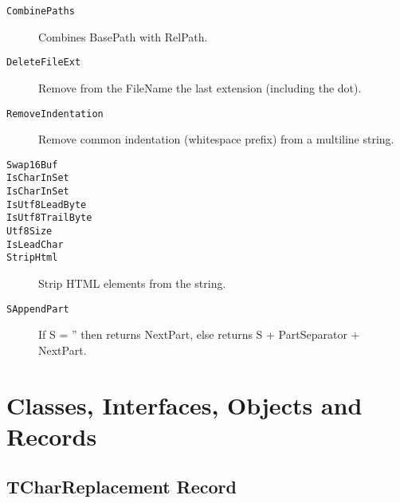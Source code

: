 \documentclass{report}
\newif\ifpdf
\begin{document}
\begin{description}
\item[\texttt{CombinePaths}]Combines BasePath with RelPath.
\item[\texttt{DeleteFileExt}]Remove from the FileName the last extension (including the dot).
\item[\texttt{RemoveIndentation}]Remove common indentation (whitespace prefix) from a multiline string.
\item[\texttt{Swap16Buf}]
\item[\texttt{IsCharInSet}]
\item[\texttt{IsCharInSet}]
\item[\texttt{IsUtf8LeadByte}]
\item[\texttt{IsUtf8TrailByte}]
\item[\texttt{Utf8Size}]
\item[\texttt{IsLeadChar}]
\item[\texttt{StripHtml}]Strip HTML elements from the string.
\item[\texttt{SAppendPart}]If S = '' then returns NextPart, else returns S + PartSeparator + NextPart.
\end{description}
\section{Classes, Interfaces, Objects and Records}
\ifpdf
\subsection*{\large{\textbf{TCharReplacement Record}}\normalsize\hspace{1ex}\hrulefill}
\else
\subsection*{TCharReplacement Record}
\fi
\label{PasDoc_Utils.TCharReplacement}
\end{document}
